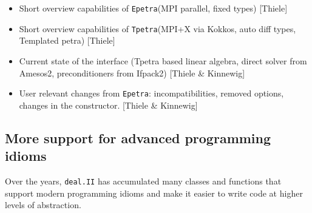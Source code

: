 \documentclass{ansarticle-preprint}
\newcommand{\specialword}[1]{\texttt{#1}}
\newcommand{\dealii}{{\specialword{deal.II}}\xspace}
\newcommand{\epetra}{{\specialword{Epetra}}\xspace}
\newcommand{\tpetra}{{\specialword{Tpetra}}\xspace}
\begin{document}
\begin{itemize}
  \item Short overview capabilities of \epetra (MPI parallel, fixed types) [Thiele]
  \item Short overview capabilities of \tpetra (MPI+X via Kokkos, auto diff types, Templated petra) [Thiele]
  \item Current state of the interface (Tpetra based linear algebra, direct solver from Amesos2, preconditioners from Ifpack2) [Thiele \& Kinnewig]
  \item User relevant changes from \epetra: incompatibilities, removed
    options, changes in the constructor. [Thiele \& Kinnewig]
\end{itemize}

\subsection{More support for advanced programming idioms}\label{sec:tools}

Over the years, \dealii{} has accumulated many classes and functions
that support modern programming idioms and make it easier to write
code at higher levels of abstraction.
\end{document}
